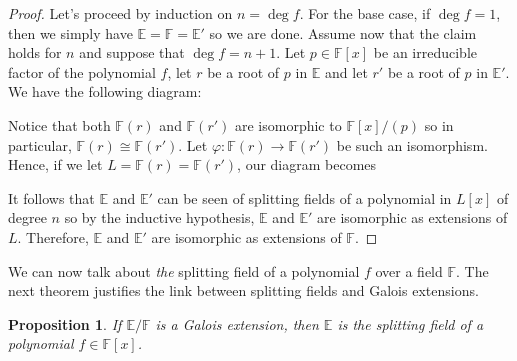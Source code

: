 \documentclass{article}
\theoremstyle{plain}
\newtheorem{proposition}[theorem]{Proposition}
\theoremstyle{definition}
\newcommand{\F}{\mathbb{F}}
\newcommand{\E}{\mathbb{E}}
\newcommand{\isomorphic}{\cong}
\begin{document}
\begin{proof}
    Let's proceed by induction on $n = \deg f$. For the base case, if $\deg f = 1$, then we simply have $\E = \F = \E'$ so we are done. Assume now that the claim holds for $n$ and suppose that $\deg f = n+1$. Let $p \in \F[x]$ be an irreducible factor of the polynomial $f$, let $r$ be a root of $p$ in $\E$ and let $r'$ be a root of $p$ in $\E'$. We have the following diagram:
    \begin{center}
    \end{center}
    Notice that both $\F(r)$ and $\F(r')$ are isomorphic to $\F[x]/(p)$ so in particular, $\F(r) \isomorphic \F(r')$. Let $\varphi : \F(r) \to \F(r')$ be such an isomorphism. Hence, if we let $L = \F(r) = \F(r')$, our diagram becomes
    \begin{center}
    \end{center}
    It follows that $\E$ and $\E'$ can be seen of splitting fields of a polynomial in $L[x]$ of degree $n$ so by the inductive hypothesis, $\E$ and $\E'$ are isomorphic as extensions of $L$. Therefore, $\E$ and $\E'$ are isomorphic as extensions of $\F$. 
\end{proof}

We can now talk about \textit{the} splitting field of a polynomial $f$ over a field $\F$. The next theorem justifies the link between splitting fields and Galois extensions. 

\begin{proposition}
\label{Galois implies splitting field}
    If $\E / \F$ is a Galois extension, then $\E$ is the splitting field of a polynomial $f \in \F[x]$.
\end{proposition}
\end{document}
